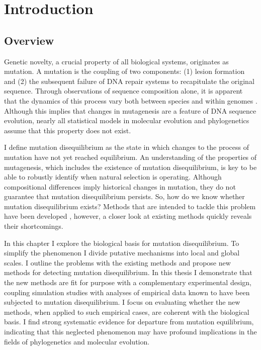 \chapter{Introduction}

\section{Overview}
Genetic novelty, a crucial property of all biological systems, originates as mutation. A mutation is the coupling of two components: (1) lesion formation and (2) the subsequent failure of DNA repair systems to recapitulate the original sequence. Through observations of sequence composition alone, it is apparent that the dynamics of this process vary both between species \citep{Karlin1994ComparisonsSequences} and within genomes \citep{Francioli2015Genome-wideHumans}. Although this implies that changes in mutagenesis are a feature of DNA sequence evolution, nearly all statistical models in molecular evolution and phylogenetics assume that this property does not exist. 

I define mutation disequilibrium as the state in which changes to the process of mutation have not yet reached \gls{equilibrium}. An understanding of the properties of mutagenesis, which includes the existence of mutation disequilibrium, is key to be able to robustly identify when natural selection is operating. Although compositional differences imply historical changes in mutation, they do not guarantee that mutation disequilibrium persists. So, how do we know whether mutation disequilibrium exists? Methods that are intended to tackle this problem have been developed \citep{Squartini2008QuantifyingProcess, Singh2009StrongDrosophila, Ababneh2006Matched-pairsSequences}, however, a closer look at existing methods quickly reveals their shortcomings. 

In this chapter I explore the biological basis for mutation disequilibrium. To simplify the phenomenon I divide putative mechanisms into local and global scales. I outline the problems with the existing methods and propose new methods for detecting mutation disequilibrium. In this thesis I demonstrate that the new methods are fit for purpose with a complementary experimental design, coupling simulation studies with analyses of empirical data known to have been subjected to mutation disequilibrium. I focus on evaluating whether the new methods, when applied to such empirical cases, are coherent with the biological basis. I find strong systematic evidence for departure from mutation equilibrium, indicating that this neglected phenomenon may have profound implications in the fields of phylogenetics and molecular evolution. 

